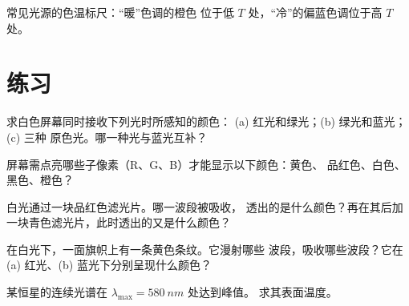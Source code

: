 \begin{omfigure}

{\small 常见光源的色温标尺：“暖”色调的橙色
位于低 $T$ 处，“冷”的偏蓝色调位于高 $T$ 处。}
\end{omfigure}

\section{练习}

\begin{exercise}[$\star$]\label{exo:g11:color-light-sources:1}
求白色屏幕同时接收下列光时所感知的颜色：
(a) 红光和绿光；(b) 绿光和蓝光；(c) 三种
原色光。哪一种光与蓝光互补？
\end{exercise}

\begin{exercise}[$\star$]\label{exo:g11:color-light-sources:2}
屏幕需点亮哪些子像素（R、G、B）才能显示以下颜色：黄色、
品红色、白色、黑色、橙色？
\end{exercise}

\begin{exercise}[$\star$]\label{exo:g11:color-light-sources:3}
白光通过一块品红色滤光片。哪一波段被吸收，
透出的是什么颜色？再在其后加一块青色滤光片，此时透出的又是什么颜色？
\end{exercise}

\begin{exercise}[$\star$]\label{exo:g11:color-light-sources:4}
在白光下，一面旗帜上有一条黄色条纹。它漫射哪些
波段，吸收哪些波段？它在 (a) 红光、(b) 蓝光下分别呈现什么颜色？
\end{exercise}

\begin{exercise}[$\star$]\label{exo:g11:color-light-sources:5}
某恒星的连续光谱在 $\lambda_{\max} = \qty{580}{nm}$ 处达到峰值。
求其表面温度。
\end{exercise}

